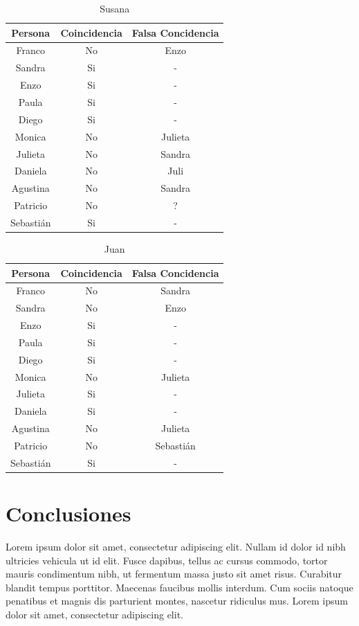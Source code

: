 \documentclass[a4paper,10pt]{article}
\begin{document}
\begin{center}
\begin{table}[h]
\centering
\begin{tabular}{ccc}
\hline
\textbf{Persona} & \textbf{Coincidencia} & \textbf{Falsa Concidencia} \\ \hline
Franco&No&Enzo\\
Sandra&Si&-\\
Enzo&Si&-\\     
Paula&Si&-\\     
Diego&Si&-\\ 
Monica&No&Julieta\\
Julieta&No&Sandra\\
Daniela&No&Juli\\
Agustina&No&Sandra\\
Patricio&No&?\\
Sebastián&Si&-\\
\end{tabular}
\caption[Texto del índice (opcional)]{Susana}
\end{table}
\end{center}

\begin{center}
\begin{table}[h]
\centering
\begin{tabular}{ccc}
\hline
\textbf{Persona} & \textbf{Coincidencia} & \textbf{Falsa Concidencia} \\ \hline
Franco&No&Sandra\\
Sandra&No&Enzo\\
Enzo&Si&-\\     
Paula&Si&-\\     
Diego&Si&-\\ 
Monica&No&Julieta\\
Julieta&Si&-\\
Daniela&Si&-\\
Agustina&No&Julieta\\
Patricio&No&Sebastián\\
Sebastián&Si&-\\
\end{tabular}
\caption[Texto del índice (opcional)]{Juan}
\end{table}
\end{center}

\section{Conclusiones}
Lorem ipsum dolor sit amet, consectetur adipiscing elit. Nullam id dolor id nibh ultricies vehicula ut id elit. Fusce dapibus, tellus ac cursus commodo, tortor mauris condimentum nibh, ut fermentum massa justo sit amet risus. Curabitur blandit tempus porttitor. Maecenas faucibus mollis interdum. Cum sociis natoque penatibus et magnis dis parturient montes, nascetur ridiculus mus. Lorem ipsum dolor sit amet, consectetur adipiscing elit.
\end{document}
